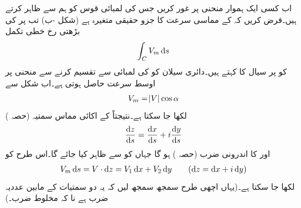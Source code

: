 اب کسی ایک ہموار منحنی  پر غور کریں جس کی  لمبائی قوس کو ہم  سے ظاہر کرتے ہیں۔فرض کریں کہ  کے  مماسی  سرعت  کا  جزو حقیقی متغیرہ   ہے (شکل -ب) تب  پر  کی بڑھتی رخ خطی تکمل
\begin{align}
\int_C V_m\dif s
\end{align}
کو  پر سیال کا   کہتے ہیں۔دائری سیلان کو  کی لمبائی سے تقسیم کرنے سے منحنی  پر اوسط سرعت 
 حاصل ہوتی ہے۔اب شکل  سے
\begin{align*}
V_m=\abs{V}\cos \alpha
\end{align*}
لکھا جا سکتا ہے۔نتیجتاً   کے اکائی مماس سمتیہ (حصہ )
\begin{align*}
\frac{\dif z}{\dif s}=\frac{\dif x}{\dif s}+i\frac{\dif y}{\dif s}
\end{align*}
اور  کا اندرونی ضرب (حصہ )  ہو گا جہاں  کو  سے ظاہر کیا جائے گا۔اس طرح  کو 
\begin{align*}
V_m\dif s=V\cdot \dif z=V_1\dif x+V_2\dif y\quad \quad (\dif z=\dif x+i\dif y)
\end{align*}
لکھا جا سکتا ہے۔(یہاں اچھی طرح سمجھ سمجھ لیں کہ یہ دو سمتیات کے مابین عددیہ ضرب ہے نا کہ مخلوط ضرب۔)

